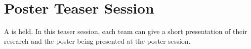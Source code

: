 
\section{Poster Teaser Session}
\label{sec:poster_teaser_session}
A  is held. In this teaser session, each team can give a short presentation of their research and the poster being presented at the poster session.


